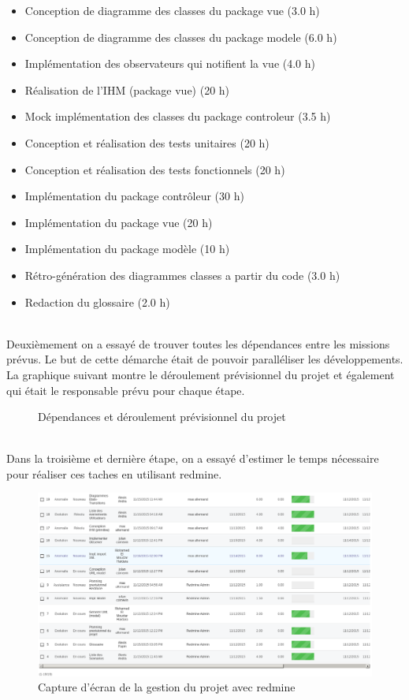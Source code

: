 \documentclass[10pt,a4paper]{book}
\begin{document}
\begin{itemize}
	\item{Conception de diagramme des classes du package vue (3.0 h)}
	\item{Conception de diagramme des classes du package modele (6.0 h)}
	\item{Implémentation des observateurs qui notifient la vue (4.0 h)}
	\item{Réalisation de l'IHM (package vue) (20 h)}
	\item{Mock implémentation des classes du package controleur (3.5 h)}
	\item{Conception et réalisation des tests unitaires (20 h)}	
	\item{Conception et réalisation des tests fonctionnels (20 h)}
	\item{Implémentation du package contrôleur (30 h)}
	\item{Implémentation du package vue (20 h)}
	\item{Implémentation du package modèle (10 h)}
	\item{Rétro-génération des diagrammes classes a partir du code (3.0 h)}
	\item{Redaction du glossaire (2.0 h)}
\end{itemize}
~\\Deuxièmement on a essayé de trouver toutes les dépendances entre les missions prévus. Le but de cette démarche était de pouvoir paralléliser les développements. La graphique suivant montre le déroulement prévisionnel du projet et également qui était le responsable prévu pour chaque étape.

\begin{figure}[ht!]
    \centering
    \scalebox{.65}{}
    \caption{Dépendances et déroulement prévisionnel du projet}
\end{figure}

~\\Dans la troisième et dernière étape, on a essayé d'estimer le temps nécessaire pour réaliser ces taches en utilisant redmine.
\begin{figure}
    \centering
    \includegraphics[scale=0.25]{redmine.png}
    \caption{Capture d'écran de la gestion du projet avec redmine} 
\end{figure}
\end{document}

